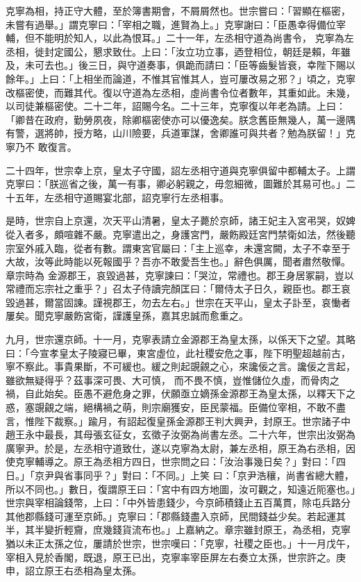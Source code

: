\begin{pinyinscope}
 克寧為相，持正守大體，至於簿書期會，不屑屑然也。世宗嘗曰：「習顯在樞密，未嘗有過舉。」謂克寧曰：「宰相之職，進賢為上。」克寧謝曰：「臣愚幸得備位宰輔，但不能明於知人，以此為恨耳。」二十一年，左丞相守道為尚書令，
 克寧為左丞相，徙封定國公，懇求致仕。上曰：「汝立功立事，迺登相位，朝廷是賴，年雖及，未可去也。」後三日，與守道奏事，俱跪而請曰：「臣等齒髮皆衰，幸陛下賜以餘年。」上曰：「上相坐而論道，不惟其官惟其人，豈可屢改易之邪？」頃之，克寧改樞密使，而難其代。復以守道為左丞相，虛尚書令位者數年，其重如此。未幾，以司徒兼樞密使。二十二年，詔賜今名。二十三年，克寧復以年老為請。上曰：「卿昔在政府，勤勞夙夜，除卿樞密使亦可以優逸矣。朕念舊臣無幾人，萬一邊隅有警，選將帥，授方略，山川險要，兵道軍謀，舍卿誰可與共者？勉為朕留！」克寧乃不
 敢復言。



 二十四年，世宗幸上京，皇太子守國，詔左丞相守道與克寧俱留中都輔太子。上謂克寧曰：「朕巡省之後，萬一有事，卿必躬親之，毋忽細微，圖難於其易可也。」二十五年，左丞相守道賜宴北部，詔克寧行左丞相事。



 是時，世宗自上京還，次天平山清暑，皇太子薨於京師，諸王妃主入宮弔哭，奴婢從入者多，頗喧雜不嚴。克寧遣出之，身護宮門，嚴飭殿廷宮門禁衛如法，然後聽宗室外戚入臨，從者有數。謂東宮官屬曰：「主上巡幸，未還宮闕，太子不幸至于大故，汝等此時能以死報國乎？吾亦不敢愛吾生也。」辭色俱厲，聞者肅然敬憚。章宗時為
 金源郡王，哀毀過甚，克寧諫曰：「哭泣，常禮也。郡王身居冢嗣，豈以常禮而忘宗社之重乎？」召太子侍讀完顏匡曰：「爾侍太子日久，親臣也。郡王哀毀過甚，爾當固諫。謹視郡王，勿去左右。」世宗在天平山，皇太子訃至，哀慟者屢矣。聞克寧嚴飭宮衛，謹護皇孫，嘉其忠誠而愈重之。



 九月，世宗還京師。十一月，克寧表請立金源郡王為皇太孫，以係天下之望。其略曰：「今宣孝皇太子陵寢已畢，東宮虛位，此社稷安危之事，陛下明聖超越前古，寧不察此。事貴果斷，不可緩也。緩之則起覬覦之心，來讒佞之言。讒佞之言起，雖欲無疑得乎？茲事深可畏、大可慎，
 而不畏不慎，豈惟儲位久虛，而骨肉之禍，自此始矣。臣愚不避危身之罪，伏願亟立嫡孫金源郡王為皇太孫，以釋天下之惑，塞覬覦之端，絕構禍之萌，則宗廟獲安，臣民蒙福。臣備位宰相，不敢不盡言，惟陛下裁察。」踰月，有詔起復皇孫金源郡王判大興尹，封原王。世宗諸子中趙王永中最長，其母張玄征女，玄徵子汝弼為尚書左丞。二十六年，世宗出汝弼為廣寧尹。於是，左丞相守道致仕，遂以克寧為太尉，兼左丞相，原王為右丞相，因使克寧輔導之。原王為丞相方四日，世宗問之曰：「汝治事幾日矣？」對曰：「四日。」「京尹與省事同乎？」對曰：「不同。」上笑
 曰：「京尹浩穰，尚書省總大體，所以不同也。」數日，復謂原王曰：「宮中有四方地圖，汝可觀之，知遠近阨塞也。」世宗與宰相論錢幣，上曰：「中外皆患錢少，今京師積錢止五百萬貫，除屯兵路分其他郡縣錢可運至京師。」克寧曰：「郡縣錢盡入京師，民間錢益少矣。若起運其半，其半變折輕齎，庶幾錢貨流布也。」上嘉納之。章宗雖封原王，為丞相，克寧猶以未正太孫之位，屢請於世宗，世宗嘆曰：「克寧，社稷之臣也。」十一月戊午，宰相入見於香閣，既退，原王已出，克寧率宰臣屏左右奏立太孫，世宗許之。庚申，詔立原王右丞相為皇太孫。




\end{pinyinscope}
